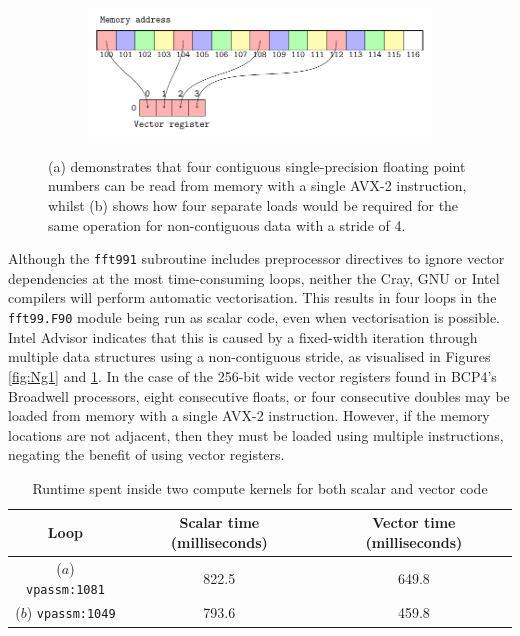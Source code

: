 \documentclass[a4paper,11pt]{report}
\begin{document}
\begin{figure}[htbp]\ContinuedFloat

\begin{subfigure}[b]{1\textwidth}
\centering
   \includegraphics[width=0.9\linewidth]{img/tikz-img/vector_registers_noncontiguous/vector_registers.pdf}
   \caption{}
   \label{fig:Ng2}
\end{subfigure}

\caption[Contiguous and non-contiguous memory access]{ (a) demonstrates that four contiguous single-precision floating point numbers can be read from memory with a single AVX-2 instruction, whilst (b) shows how four separate loads would be required for the same operation for non-contiguous data with a stride of 4.}
\label{fig:vector-registers}
\end{figure}
\par
Although the \texttt{fft991} subroutine includes preprocessor directives to ignore vector dependencies at the most time-consuming loops, neither the Cray, GNU or Intel compilers will perform automatic vectorisation. This results in four loops in the \texttt{fft99.F90} module being run as scalar code, even when vectorisation is possible. Intel Advisor indicates that this is caused by a fixed-width iteration through multiple data structures using a non-contiguous stride, as visualised in Figures \ref{fig:Ng1} and \ref{fig:Ng2}. In the case of the 256-bit wide vector registers found in BCP4's Broadwell processors, eight consecutive floats, or four consecutive doubles may be loaded from memory with a single AVX-2 instruction. However, if the memory locations are not adjacent, then they must be loaded using multiple instructions, negating the benefit of using vector registers. 
\par
\begin{table}[htp]
\caption{Runtime spent inside two compute kernels for both scalar and vector code}
\begin{center}
\begin{tabular}{ c c c }
\toprule 		
Loop						&	Scalar time (milliseconds)	&	Vector time (milliseconds)	\\ 
\midrule
($a$) \texttt{vpassm:1081}		&	822.5				&	649.8				\\
($b$) \texttt{vpassm:1049}		&	793.6				&	459.8				\\
\bottomrule
\end{tabular}
\end{center}
\label{tbl:force-vec}
\end{table}
\end{document}

